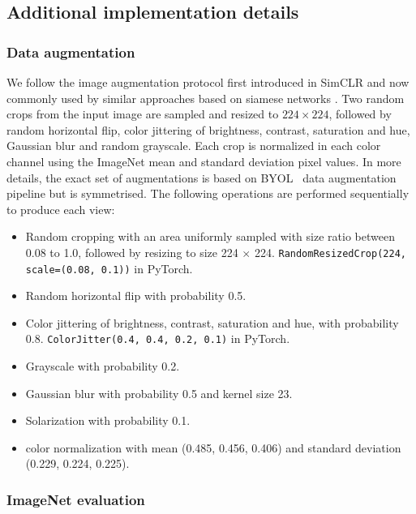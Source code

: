 \subsection{Additional implementation details} \label{app:sec_impl_details}

\subsubsection{Data augmentation} \label{app:data_aug}

We follow the image augmentation protocol first introduced in SimCLR \cite{chen2020simclr} and now commonly used by similar approaches based on siamese networks \cite{caron2020swav, grill2020byol, chen2020simsiam, zbontar2021barlow}. Two random crops from the input image are sampled and resized to $224 \times 224$, followed by random horizontal flip, color jittering of brightness, contrast, saturation and hue, Gaussian blur and random grayscale. Each crop is normalized in each color channel using the ImageNet mean and standard deviation pixel values.
In more details, the exact set of augmentations is based on BYOL~\cite{grill2020byol} data augmentation pipeline but is symmetrised. The following operations are performed sequentially to produce each view:
\begin{itemize}
    \item Random cropping with an area uniformly sampled with size ratio between 0.08 to 1.0, followed by resizing to size 224 $\times$ 224. \texttt{RandomResizedCrop(224, scale=(0.08, 0.1))} in PyTorch.
    \item Random horizontal flip with probability 0.5.
    \item Color jittering of brightness, contrast, saturation and hue, with probability 0.8. \texttt{ColorJitter(0.4, 0.4, 0.2, 0.1)} in PyTorch.
    \item Grayscale with probability 0.2.
    \item Gaussian blur with probability 0.5 and kernel size 23.
    \item Solarization with probability 0.1.
    \item color normalization with mean (0.485, 0.456, 0.406) and standard deviation (0.229, 0.224, 0.225).
\end{itemize}

\subsubsection{ImageNet evaluation} \label{app:eval_imnet}

